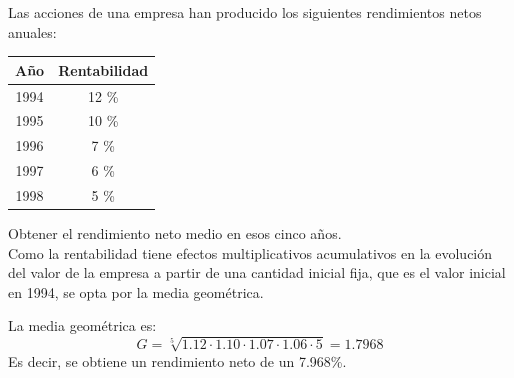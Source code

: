 \begin{ejercicio}
    Las acciones de una empresa han producido los siguientes rendimientos netos anuales:
    \begin{table}[H]
        \centering
        \begin{tabular}{cc}
            Año & Rentabilidad \\ \hline
            1994 & 12 \% \\
            1995 & 10 \% \\
            1996 & 7 \% \\
            1997 & 6 \% \\
            1998 & 5 \%
        \end{tabular}
    \end{table}
    Obtener el rendimiento neto medio en esos cinco años.\\

    Como la rentabilidad tiene efectos multiplicativos acumulativos en la evolución del valor de la empresa a partir de una cantidad inicial fija, que es el valor inicial en 1994, se opta por la media geométrica.
    
    La media geométrica es: $$G = \sqrt[5]{1.12\cdot1.10\cdot1.07\cdot1.06\cdot5} = 1.7968 $$
    Es decir, se obtiene un rendimiento neto de un 7.968\%.\\
\end{ejercicio}

